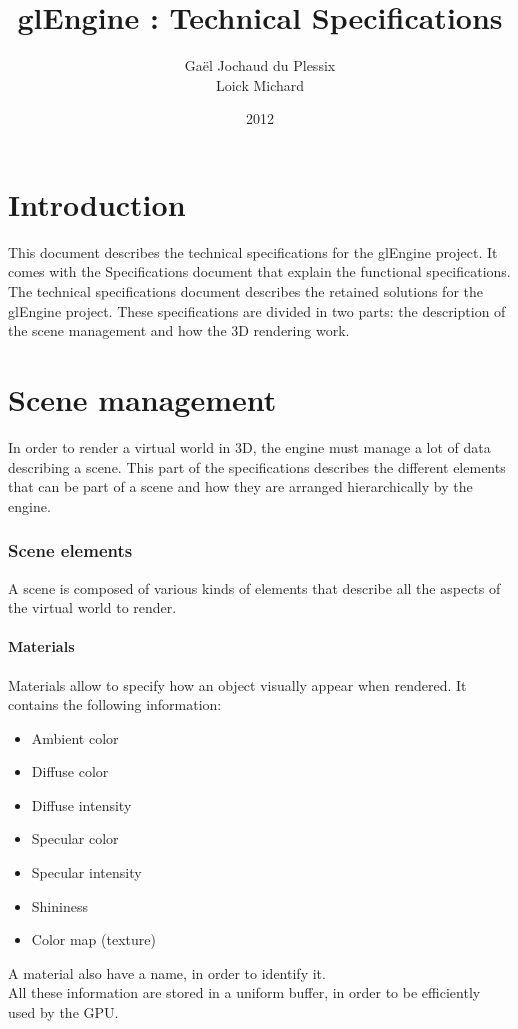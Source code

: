 \documentclass [a4 paper,11pt]{article}
\title {glEngine : Technical Specifications}
\author {Gaël Jochaud du Plessix\\
Loick Michard}
\date {2012}
\begin{document}
\maketitle

\newpage

\tableofcontents

\newpage

\part{Introduction}
This document describes the technical specifications for the glEngine project. It comes with the Specifications document that explain the functional specifications. The technical specifications document describes the retained solutions for the glEngine project. These specifications are divided in two parts: the description of the scene management and how the 3D rendering work.

\part{Scene management}
In order to render a virtual world in 3D, the engine must manage a lot of data describing a scene. This part of the specifications describes the different elements that can be part of a scene and how they are arranged hierarchically by the engine.

\section{Scene elements}
A scene is composed of various kinds of elements that describe all the aspects of the virtual world to render.

\subsection{Materials}
Materials allow to specify how an object visually appear when rendered. It contains the following information:
\begin{itemize}
\item Ambient color
\item Diffuse color
\item Diffuse intensity
\item Specular color
\item Specular intensity
\item Shininess
\item Color map (texture)
\end{itemize}
A material also have a name, in order to identify it.\\
All these information are stored in a uniform buffer, in order to be efficiently used by the GPU.
\end{document}

